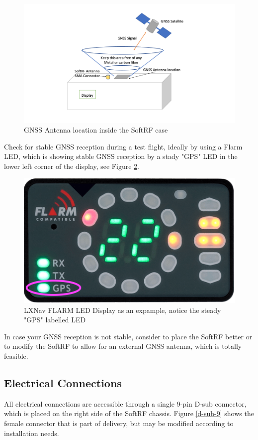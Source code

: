 \documentclass[11pt,a4paper]{article}
\begin{document}
\begin{figure}[h]
\centering
\includegraphics[scale=.5]{gnss_antenna.png}
\caption{GNSS Antenna location inside the SoftRF case}\label{fig_gnss_ant}
\end{figure}

Check for stable  GNSS reception during a test flight, ideally by using a Flarm LED, which is showing stable GNSS reception by a stady "GPS" LED in the lower left corner of the display, see Figure \ref{flarm_led}.

\begin{figure}[h]
\centering
\includegraphics[scale=.4]{lxnav_flarm_led_display.png}
\caption{LXNav FLARM LED Display as an expample, notice the steady "GPS" labelled LED}\label{flarm_led}
\end{figure}

In case your GNSS reception is not stable, consider to place the SoftRF better or to modify the SoftRF to allow for an external GNSS antenna, which is totally feasible.

\FloatBarrier

\subsection{Electrical Connections}
All electrical connections are accessible through a single 9-pin D-sub connector, which is placed on the right side of the SoftRF chassis. Figure \ref{d-sub-9} shows the female connector that is part of delivery, but may be modified according to installation needs.
\end{document}
